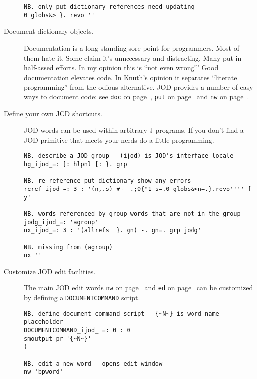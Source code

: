 \begin{description}
\begin{lstlisting}[frame=single,framerule=0pt]
NB. only put dictionary references need updating
0 globs&> }. revo ''
\end{lstlisting}
 
 
\item[Document dictionary objects.]  Documentation is a long standing sore point for programmers.  
Most of them hate it. Some claim it's unnecessary and distracting.  Many put in half-assed efforts. 
In my opinion this is ``not even wrong!''  Good documentation elevates code. In 
\href{https://www-cs-faculty.stanford.edu/~knuth/}{Knuth's} \cite{knuth:web} opinion it separates
``literate programming'' from the odious alternative.   JOD provides a number of easy ways to document code: see \hyperlink{il:doc}{\texttt{doc}} on page~\pageref{ss:doc}, 
\hyperlink{il:put}{\texttt{put}} on page~\pageref{ss:put} and \hyperlink{il:nw}{\texttt{nw}} on page~\pageref{ss:nw}.


\item[Define your own JOD shortcuts.]  JOD words can be used 
within arbitrary J programs.  If you don't find a JOD primitive that meets 
your needs do a little programming.

\begin{lstlisting}[frame=single,framerule=0pt]
NB. describe a JOD group - (ijod) is JOD's interface locale
hg_ijod_=: [: hlpnl [: }. grp
   
NB. re-reference put dictionary show any errors
reref_ijod_=: 3 : '(n,.s) #~ -.;0{"1 s=.0 globs&>n=.}.revo'''' [ y'
   
NB. words referenced by group words that are not in the group
jodg_ijod_=: 'agroup'
nx_ijod_=: 3 : '(allrefs  }. gn) -. gn=. grp jodg'
   
NB. missing from (agroup)
nx ''
\end{lstlisting}
 

\item[Customize JOD edit facilities.]  The main JOD edit words \hyperlink{il:nw}{\texttt{nw}} on page~\pageref{ss:nw} and
 \hyperlink{il:ed}{\texttt{ed}} on page~\pageref{ss:ed} can be customized by defining a \texttt{DOCUMENTCOMMAND} script.

\begin{lstlisting}[frame=single,framerule=0pt]
NB. define document command script - {~N~} is word name placeholder
DOCUMENTCOMMAND_ijod_ =: 0 : 0
smoutput pr '{~N~}'
) 
   
NB. edit a new word - opens edit window
nw 'bpword'
\end{lstlisting}
 


\end{description}

